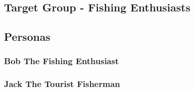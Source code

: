 \subsection{Target Group - Fishing Enthusiasts}

\subsection{Personas}
\subsubsection*{Bob The Fishing Enthusiast}

\subsubsection*{Jack The Tourist Fisherman}